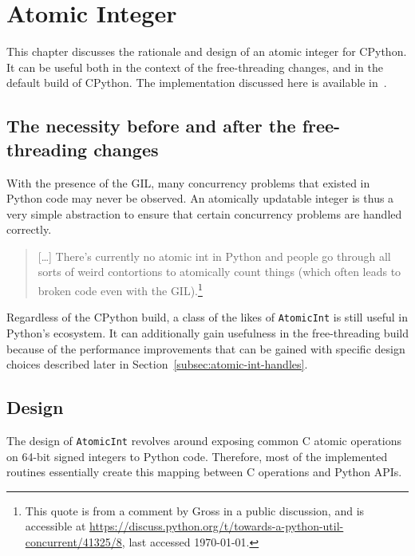 \chapter{Atomic Integer}\label{ch:atomic-int}

This chapter discusses the rationale and design of an atomic integer for CPython.
It can be useful both in the context of the free-threading changes, and in the default build of CPython.
The implementation discussed here is available in~\cite[src/cereggii/atomic\_int]{cereggii}.


\section[The necessity before and after the free-threading changes]{The necessity before and after the free-\\threading changes}\label{sec:the-necessity-before-and-after-the-free-threading-changes}

With the presence of the GIL, many concurrency problems that existed in Python code may never be observed.
An atomically updatable integer is thus a very simple abstraction to ensure that certain concurrency problems are handled correctly.

\begin{quote}
    [\ldots] There's currently no atomic int in Python and people go through all sorts of weird contortions to atomically count things (which often leads to broken code even with the GIL).\footnote{%
    This quote is from a comment by Gross in a public discussion, and is accessible at \url{https://discuss.python.org/t/towards-a-python-util-concurrent/41325/8}, last accessed \today.
}
\end{quote}

Regardless of the CPython build, a class of the likes of \texttt{AtomicInt} is still useful in Python's ecosystem.
It can additionally gain usefulness in the free-threading build because of the performance improvements that can be gained with specific design choices described later in Section~\ref{subsec:atomic-int-handles}.


\section{Design}\label{sec:atomic-int-design}

The design of \texttt{AtomicInt} revolves around exposing common C atomic operations on 64-bit signed integers to Python code.
Therefore, most of the implemented routines essentially create this mapping between C operations and Python APIs.

